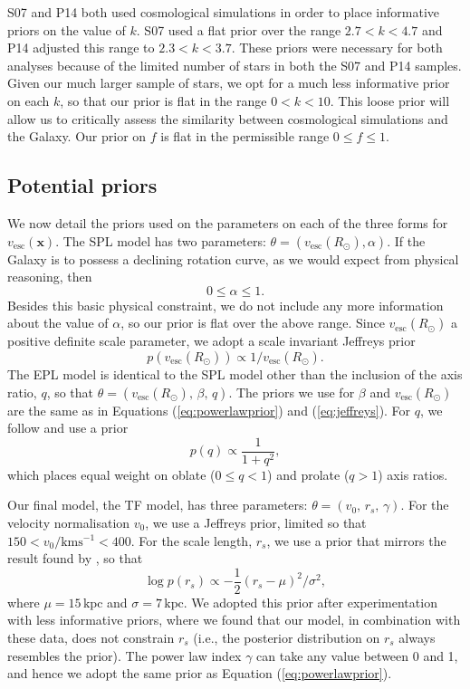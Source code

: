 \documentclass[useAMS,twocolumn,usenatbib]{mn2e}
\def\kpc{{\,\mathrm{kpc}}}
\def\vesc{{v_\mathrm{esc}}}
\def\pos{{\boldsymbol{x}}}
\begin{document}
S07 and P14 both used cosmological simulations in order to place informative priors on 
the value of $k$. S07 used a flat prior over the range $2.7 < k < 4.7$ and P14 
adjusted this range to $2.3 < k < 3.7$. These priors were necessary for both analyses 
because of the limited number of stars in both the S07 and P14 samples. Given our 
much larger sample of stars, we opt for a much less informative prior on each $k$, so that 
our prior is flat in the range $0 < k < 10$. This 
loose prior will allow us to critically assess the similarity between cosmological simulations 
and the Galaxy. Our prior on $f$ is flat in the permissible range $0 \leq f \leq 1$.

\subsection{Potential priors}

We now detail the priors used on the parameters on each of the three forms for $\vesc(\pos)$. 
The SPL model has two parameters: $\theta = (\vesc(R_\odot),\alpha)$. If the Galaxy is to possess 
a declining rotation curve, as we would expect from physical reasoning, then 
%
\begin{equation}
0 \leq \alpha \leq 1.
\label{eq:powerlawprior}
\end{equation}
%
Besides this basic physical constraint, we do not include any more information about the 
value of $\alpha$, so our prior is flat over the above range. Since $\vesc(R_\odot)$ 
a positive definite scale parameter, we adopt a scale invariant Jeffreys prior
%
\begin{equation}
p\left(\vesc(R_\odot)\right) \propto 1/\vesc(R_\odot).
\label{eq:jeffreys}
\end{equation}
%
The EPL model is identical to the SPL model other than the inclusion of the axis ratio, $q$, so 
that $\theta = (\vesc(R_\odot),\,\beta,\,q)$. The priors we use for $\beta$ and $\vesc(R_\odot)$ 
are the same as in Equations (\ref{eq:powerlawprior}) and (\ref{eq:jeffreys}). For $q$, we follow 
\citet{Bo16} and use a prior
%
\begin{equation}
p(q) \propto \dfrac{1}{1+q^2},
\end{equation}
%
which places equal weight on oblate ($0\leq q <1$) and prolate ($q>1$) axis ratios.

Our final model, the TF model, has three parameters: $\theta = (v_0,\,r_s,\,\gamma)$. For the 
velocity normalisation $v_0$, we use a Jeffreys prior, limited so that 
$150 < v_0/\mathrm{kms^{-1}} < 400$. For the scale length, $r_s$, we use a prior that mirrors the result 
found by \citet{Gi14}, so that
%
\begin{equation}
\log p(r_s) \propto -\dfrac{1}{2}(r_s - \mu)^2 / \sigma^2,
\end{equation}
% 
where $\mu=15\kpc$ and $\sigma=7\kpc$. We adopted this prior after experimentation with less 
informative priors, where we found that our model, in combination with these data, does not 
constrain $r_s$ (i.e., the posterior distribution on $r_s$ always resembles the prior). 
The power law index $\gamma$ can take any value between 0 and 1, and hence we adopt the 
same prior as Equation (\ref{eq:powerlawprior}).
\end{document}
